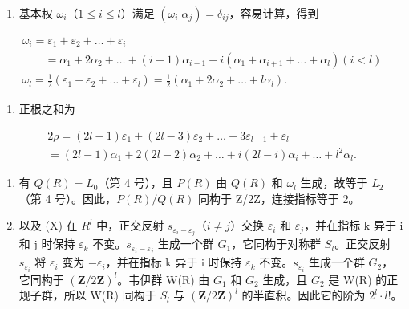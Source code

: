 \begin{enumerate}
\def\labelenumi{(\Roman{enumi})}
\setcounter{enumi}{5}
\tightlist
\item
  基本权 \(\omega_{i}\)（\(1 \leqslant i \leqslant l\)）满足 \((\omega_{i}|\alpha_{j}) = \delta_{ij}\)，容易计算，得到
\end{enumerate}

\[
\begin{array}{l} \omega_ {i} = \varepsilon_ {1} + \varepsilon_ {2} + \dots + \varepsilon_ {i} \\ \qquad = \alpha_ {1} + 2 \alpha_ {2} + \dots + (i - 1) \alpha_ {i - 1} + i (\alpha_ {1} + \alpha_ {i + 1} + \dots + \alpha_ {l}) (i <   l) \\ \omega_ {l} = \frac {1}{2} (\varepsilon_ {1} + \varepsilon_ {2} + \dots + \varepsilon_ {l}) = \frac {1}{2} (\alpha_ {1} + 2 \alpha_ {2} + \dots + l \alpha_ {l}). \end{array}
\]

\begin{enumerate}
\def\labelenumi{(\Roman{enumi})}
\setcounter{enumi}{6}
\tightlist
\item
  正根之和为
\end{enumerate}

\[
\begin{array}{l} 2 \rho = (2 l - 1) \varepsilon_ {1} + (2 l - 3) \varepsilon_ {2} + \dots + 3 \varepsilon_ {l - 1} + \varepsilon_ {l} \\ = (2 l - 1) \alpha_ {1} + 2 (2 l - 2) \alpha_ {2} + \dots + i (2 l - i) \alpha_ {i} + \dots + l ^ {2} \alpha_ {l}. \end{array}
\]

\begin{enumerate}
\def\labelenumi{(\Roman{enumi})}
\setcounter{enumi}{7}
\item
  有 \(Q(R) = L_{0}\)（第 4 号），且 \(P(R)\) 由 \(Q(R)\) 和 \(\omega_{l}\) 生成，故等于 \(L_{2}\)（第 4 号）。因此，\(P(R)/Q(R)\) 同构于 Z/2Z，连接指标等于 2。
\item
  以及 (X) 在 \(R^{l}\) 中，正交反射 \(s_{\varepsilon_{i}-\varepsilon_{j}}\)（\(i \neq j\)）交换 \(\varepsilon_{i}\) 和 \(\varepsilon_{j}\)，并在指标 k 异于 i 和 j 时保持 \(\varepsilon_{k}\) 不变。\(s_{\varepsilon_{i}-\varepsilon_{j}}\) 生成一个群 \(G_{1}\)，它同构于对称群 \(S_{l}\)。正交反射 \(s_{\varepsilon_{i}}\) 将 \(\varepsilon_{i}\) 变为 \(-\varepsilon_{i}\)，并在指标 k 异于 i 时保持 \(\varepsilon_{k}\) 不变。\(s_{\varepsilon_{i}}\) 生成一个群 \(G_{2}\)，它同构于 \((\mathbf{Z}/2\mathbf{Z})^{l}\)。韦伊群 W(R) 由 \(G_{1}\) 和 \(G_{2}\) 生成，且 \(G_{2}\) 是 W(R) 的正规子群，所以 W(R) 同构于 \(S_{l}\) 与 \((\mathbf{Z}/2\mathbf{Z})^{l}\) 的半直积。因此它的阶为 \(2^{l}\cdot l!\)。
\end{enumerate}

